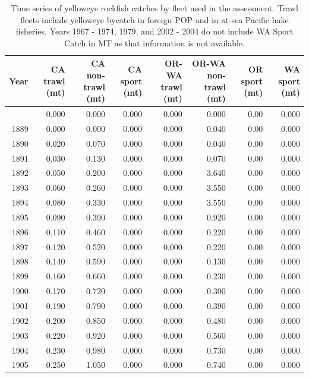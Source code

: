 \documentclass[
]{scrartcl}
\begin{document}
\begin{longtable}{rrrrrrrr}

\caption{\label{tbl-all_removals}Time series of yelloweye rockfish
catches by fleet used in the assessment. Trawl fleets include yelloweye
bycatch in foreign POP and in at-sea Pacific hake fisheries. Years 1967
- 1974, 1979, and 2002 - 2004 do not include WA Sport Catch in MT as
that information is not available.}

\tabularnewline

\toprule
Year & CA trawl (mt) & CA non-trawl (mt) & CA sport (mt) & OR-WA trawl (mt) & OR-WA non-trawl (mt) & OR sport (mt) & WA sport (mt) \\ 
\midrule\addlinespace[2.5pt]
-999 & 0.000 & 0.000 & 0.000 & 0.000 & 0.000 & 0.00 & 0.000 \\ 
1889 & 0.000 & 0.000 & 0.000 & 0.000 & 0.040 & 0.00 & 0.000 \\ 
1890 & 0.020 & 0.070 & 0.000 & 0.000 & 0.040 & 0.00 & 0.000 \\ 
1891 & 0.030 & 0.130 & 0.000 & 0.000 & 0.070 & 0.00 & 0.000 \\ 
1892 & 0.050 & 0.200 & 0.000 & 0.000 & 3.640 & 0.00 & 0.000 \\ 
1893 & 0.060 & 0.260 & 0.000 & 0.000 & 3.550 & 0.00 & 0.000 \\ 
1894 & 0.080 & 0.330 & 0.000 & 0.000 & 3.550 & 0.00 & 0.000 \\ 
1895 & 0.090 & 0.390 & 0.000 & 0.000 & 0.920 & 0.00 & 0.000 \\ 
1896 & 0.110 & 0.460 & 0.000 & 0.000 & 0.220 & 0.00 & 0.000 \\ 
1897 & 0.120 & 0.520 & 0.000 & 0.000 & 0.220 & 0.00 & 0.000 \\ 
1898 & 0.140 & 0.590 & 0.000 & 0.000 & 0.130 & 0.00 & 0.000 \\ 
1899 & 0.160 & 0.660 & 0.000 & 0.000 & 0.230 & 0.00 & 0.000 \\ 
1900 & 0.170 & 0.720 & 0.000 & 0.000 & 0.300 & 0.00 & 0.000 \\ 
1901 & 0.190 & 0.790 & 0.000 & 0.000 & 0.390 & 0.00 & 0.000 \\ 
1902 & 0.200 & 0.850 & 0.000 & 0.000 & 0.480 & 0.00 & 0.000 \\ 
1903 & 0.220 & 0.920 & 0.000 & 0.000 & 0.560 & 0.00 & 0.000 \\ 
1904 & 0.230 & 0.980 & 0.000 & 0.000 & 0.730 & 0.00 & 0.000 \\ 
1905 & 0.250 & 1.050 & 0.000 & 0.000 & 0.740 & 0.00 & 0.000 \\ 

\end{longtable}
\end{document}
